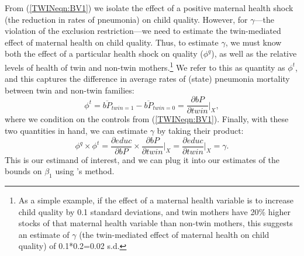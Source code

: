 \documentclass[subeqn]{article}
\begin{document}
\begin{spacing}{1.4}
From (\ref{TWINeqn:BV1}) we isolate the effect of a positive maternal health 
shock (the reduction in rates of pneumonia) on child quality.  However, for 
$\gamma$---the violation of the exclusion restriction---we need to estimate the 
twin-mediated effect of maternal health on child quality.  Thus, to estimate 
$\gamma$, we must know both the effect of a particular health shock on quality
($\phi^q$), as well as the relative levels of health of twin and non-twin 
mothers.\footnote{As a simple example, if the effect of a maternal health 
variable is to increase child quality by 0.1 standard deviations, and twin 
mothers have 20\% higher stocks of that maternal health variable than non-twin 
mothers, this suggests an estimate of $\gamma$ (the twin-mediated effect of
maternal health on child quality) of 0.1*0.2=0.02 s.d.}  We refer to this as
quantity as $\phi^t$, and this captures the difference in average rates of 
(state) pneumonia mortality between twin and non-twin families:
\begin{equation}
\label{TWINeqn:BV2}
\phi^t=\overline{bP}_{twin=1}-\overline{bP}_{twin=0}=
\frac{\partial bP}{\partial twin}\bigg|_{X},
\end{equation}
where we condition on the controls from (\ref{TWINeqn:BV1}).  Finally, with 
these two quantities in hand, we can estimate $\gamma$ by taking their product:
\begin{equation}
\label{TWINeqn:realgamma}
\phi^q\times\phi^t=\frac{\partial educ}{\partial bP}\times
\frac{\partial bP}{\partial twin}\bigg|_{X}=
\frac{\partial educ}{\partial twin}\bigg|_{X}=\gamma.
\end{equation}
This is our estimand of interest, and we can plug it into our estimates of
the bounds on $\beta_1$ using \citeauthor{Conleyetal2012}'s method.


\end{spacing}
\end{document}
